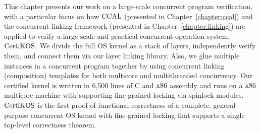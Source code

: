 This chapter presents our work on a large-scale concurrent program verification, 
with a particular focus on how $\mathrm{CCAL}$ (presented in Chapter~\ref{chapter:ccal}) and the concurrent linking framework (presented in Chapter~\ref{chapter:linking}) are applied to verify a large-scale and practical concurrent-operation system, $\mathrm{CertiKOS}$. 
We divide the full OS kernel as a stack of layers, independently verify them, and connect them via our layer linking library. 
Also, we glue multiple instances in a concurrent program together by using concurrent linking (composition) templates for 
both multicore and multithreaded concurrency. 
Our certified kernel is written in 6,500 lines of C and  $\mathrm{x86}$ assembly and runs on a  $\mathrm{x86}$ multicore machine with supporting fine-grained locking via spinlock modules. 
$\mathrm{CertiKOS}$ is the first proof of functional correctness of a complete, general-purpose concurrent OS kernel with fine-grained locking that supports a single top-level correctness theorem.
